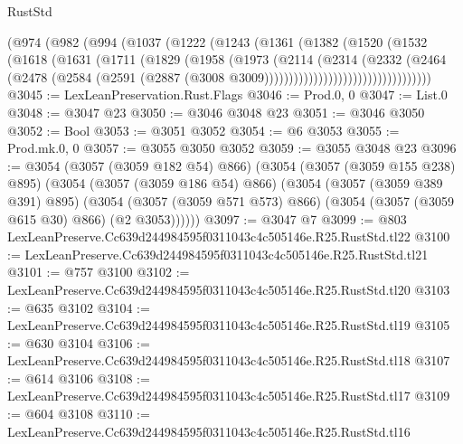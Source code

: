 \begin{lexlean}{RustStd}
\begin{coremodule}
                      (@974
                        (@982
                          (@994
                            (@1037
                              (@1222
                                (@1243
                                  (@1361
                                    (@1382
                                      (@1520
                                        (@1532
                                          (@1618
                                            (@1631
                                              (@1711
                                                (@1829
                                                  (@1958
                                                    (@1973
                                                      (@2114
                                                        (@2314
                                                          (@2332
                                                            (@2464
                                                              (@2478
                                                                (@2584
                                                                  (@2591
                                                                    (@2887
                                                                      (@3008
                                                                        @3009))))))))))))))))))))))))))))))))))
@3045 := LexLeanPreservation.Rust.Flags
@3046 := Prod.{0, 0}
@3047 := List.{0}
@3048 := @3047 @23
@3050 := @3046 @3048 @23
@3051 := @3046 @3050
@3052 := Bool
@3053 := @3051 @3052
@3054 := @6 @3053
@3055 := Prod.mk.{0, 0}
@3057 := @3055 @3050 @3052
@3059 := @3055 @3048 @23
@3096 := @3054
    (@3057 (@3059 @182 @54) @866)
    (@3054
      (@3057 (@3059 @155 @238) @895)
      (@3054
        (@3057 (@3059 @186 @54) @866)
        (@3054
          (@3057 (@3059 @389 @391) @895)
          (@3054 (@3057 (@3059 @571 @573) @866) (@3054 (@3057 (@3059 @615 @30) @866) (@2 @3053))))))
@3097 := @3047 @7
@3099 := @803 LexLeanPreserve.Cc639d244984595f0311043c4c505146e.R25.RustStd.tl22
@3100 := LexLeanPreserve.Cc639d244984595f0311043c4c505146e.R25.RustStd.tl21
@3101 := @757 @3100
@3102 := LexLeanPreserve.Cc639d244984595f0311043c4c505146e.R25.RustStd.tl20
@3103 := @635 @3102
@3104 := LexLeanPreserve.Cc639d244984595f0311043c4c505146e.R25.RustStd.tl19
@3105 := @630 @3104
@3106 := LexLeanPreserve.Cc639d244984595f0311043c4c505146e.R25.RustStd.tl18
@3107 := @614 @3106
@3108 := LexLeanPreserve.Cc639d244984595f0311043c4c505146e.R25.RustStd.tl17
@3109 := @604 @3108
@3110 := LexLeanPreserve.Cc639d244984595f0311043c4c505146e.R25.RustStd.tl16

\end{coremodule}
\end{lexlean}
